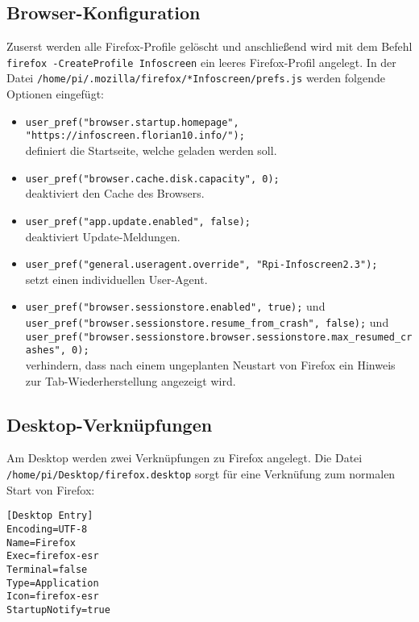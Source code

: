\subsection{Browser-Konfiguration}
\label{sec:browserconf}
Zuserst werden alle Firefox-Profile gelöscht und anschließend wird mit dem Befehl \lstinline|firefox -CreateProfile Infoscreen| ein leeres Firefox-Profil angelegt.
In der Datei \lstinline|/home/pi/.mozilla/firefox/*Infoscreen/prefs.js| werden folgende Optionen eingefügt:\\
\begin{itemize}
	\item {\lstinline|user_pref("browser.startup.homepage", "https://infoscreen.florian10.info/");|\\
		definiert die Startseite, welche geladen werden soll.}
	\item {\lstinline|user_pref("browser.cache.disk.capacity", 0);|\\
		deaktiviert den Cache des Browsers.}
	\item {\lstinline|user_pref("app.update.enabled", false);|\\
		deaktiviert Update-Meldungen.}
	\item {\lstinline|user_pref("general.useragent.override", "Rpi-Infoscreen2.3");|\\
		setzt einen individuellen User-Agent.}
	\item {\lstinline|user_pref("browser.sessionstore.enabled", true);| und \\
		\lstinline|user_pref("browser.sessionstore.resume_from_crash", false);| und \\
		\lstinline|user_pref("browser.sessionstore.browser.sessionstore.max_resumed_crashes", 0);|\\
		verhindern, dass nach einem ungeplanten Neustart von Firefox ein Hinweis zur Tab-Wiederherstellung angezeigt wird.}
\end{itemize}

\subsection{Desktop-Verknüpfungen}
\label{sec:desktopconf}
Am Desktop werden zwei Verknüpfungen zu Firefox angelegt.
Die Datei \lstinline|/home/pi/Desktop/firefox.desktop| sorgt für eine Verknüfung zum normalen Start von Firefox:\\
\begin{lstlisting}
[Desktop Entry]
Encoding=UTF-8
Name=Firefox
Exec=firefox-esr
Terminal=false
Type=Application
Icon=firefox-esr
StartupNotify=true
\end{lstlisting}

